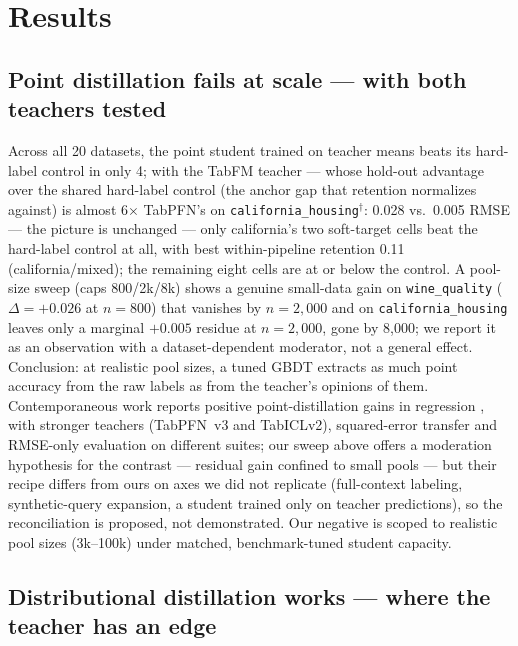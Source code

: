 \documentclass[11pt]{article}
\begin{document}
\section{Results}

\subsection{Point distillation fails at scale --- with both teachers
tested}
\label{sec:point}

Across all 20 datasets, the point student trained on teacher means beats
its hard-label control in only 4; with the TabFM teacher --- whose
hold-out advantage over the shared hard-label control (the anchor
gap that retention normalizes against) is almost 6$\times$ TabPFN's on
\texttt{california\_\allowbreak housing}$^\dagger$: 0.028 vs.\ 0.005
RMSE --- the picture is
unchanged --- only
california's two soft-target cells beat the hard-label control at all, with
best within-pipeline retention 0.11 (california/mixed); the remaining eight
cells are at or below the control. A pool-size sweep (caps 800/2k/8k) shows
a genuine small-data gain on \texttt{wine\_quality} ($\Delta = +0.026$ at
$n{=}800$) that vanishes by $n{=}2{,}000$ and on
\texttt{california\_\allowbreak housing} leaves only a marginal
$+0.005$ residue at $n{=}2{,}000$, gone by 8{,}000; we report it as an observation with a
dataset-dependent moderator, not a general effect. Conclusion: at realistic
pool sizes, a tuned GBDT extracts as much point accuracy from the raw
labels as from the teacher's opinions of them. Contemporaneous work reports positive
point-distillation gains in regression \citep{jeong2026}, with
stronger teachers (TabPFN~v3 and TabICLv2), squared-error transfer and
RMSE-only
evaluation on different suites; our sweep above offers a moderation
hypothesis for the contrast --- residual gain confined to small
pools --- but their recipe differs from ours on axes we did not
replicate (full-context labeling, synthetic-query expansion, a
student trained only on teacher predictions), so the reconciliation
is proposed, not demonstrated. Our negative is
scoped to realistic pool sizes (3k--100k) under matched, benchmark-tuned
student capacity.

\subsection{Distributional distillation works --- where the teacher has an
edge}
\label{sec:dist}
\end{document}
